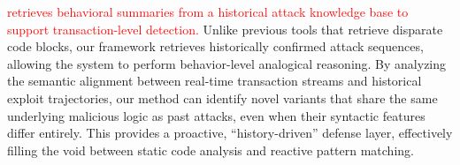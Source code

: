 \textcolor{red}{\approach{} retrieves behavioral summaries from a historical attack knowledge base to support transaction-level detection.} Unlike previous tools that retrieve disparate code blocks, our framework retrieves historically confirmed attack sequences, allowing the system to perform behavior-level analogical reasoning. By analyzing the semantic alignment between real-time transaction streams and historical exploit trajectories, our method can identify novel variants that share the same underlying malicious logic as past attacks, even when their syntactic features differ entirely. This provides a proactive, ``history-driven'' defense layer, effectively filling the void between static code analysis and reactive pattern matching.
